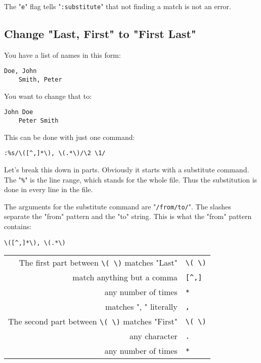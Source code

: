 The "\texttt{e}" flag tells "\texttt{:substitute}" that not finding a match is not an error.
\subsection{Change "Last, First" to "First Last"}
You have a list of names in this form:

\begin{Verbatim}[samepage=true]
    Doe, John 
    Smith, Peter 
\end{Verbatim}

You want to change that to:

\begin{Verbatim}[samepage=true]
    John Doe 
    Peter Smith 
\end{Verbatim}

This can be done with just one command:

\begin{Verbatim}[samepage=true]
 :%s/\([^,]*\), \(.*\)/\2 \1/
\end{Verbatim}

Let's break this down in parts.
Obviously it starts with a substitute command.
The "\texttt{\%}" is the line range, which stands for the whole file.
Thus the substitution is done in every line in the file.

The arguments for the substitute command are "\texttt{/from/to/}".
The slashes separate the "from" pattern and the "to" string.
This is what the "from" pattern contains:

\begin{Verbatim}[samepage=true]
	\([^,]*\), \(.*\) 
\end{Verbatim}

\begin{center}
				\begin{longtable}{r l}
								The first part between \texttt{\textbackslash{}( \textbackslash{})} matches "Last" & \texttt{\textbackslash{}( \textbackslash{})} \\
								match anything but a comma & \texttt{[\^{},]} \\
								any number of times & \texttt{*} \\
								matches ", " literally & \texttt{,} \\
								The second part between \texttt{\textbackslash{}( \textbackslash{})} matches "First" & \texttt{\textbackslash{}(  \textbackslash{})} \\
								any character & \texttt{.} \\
								any number of times & \texttt{*} \\
				\end{longtable}
\end{center}

